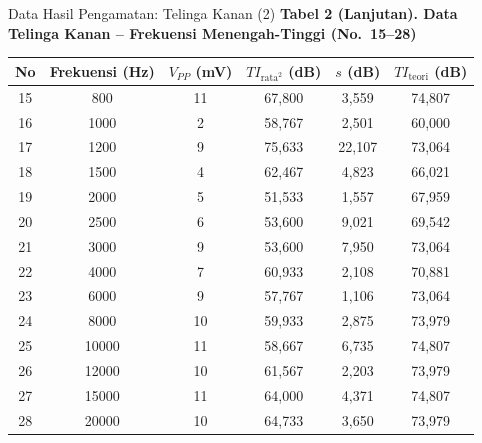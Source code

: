 \documentclass[aspectratio=169, 10pt]{beamer}
\begin{document}
	\begin{frame}{Data Hasil Pengamatan: Telinga Kanan (2)}
		\scriptsize
		\textbf{Tabel 2 (Lanjutan). Data Telinga Kanan -- Frekuensi Menengah-Tinggi (No.\ 15--28)}
		\vspace{0.1cm}
		\begin{tabular}{cccccc}
			\toprule
			No & Frekuensi (Hz) & $V_{PP}$ (mV) & $TI_{\text{rata}^2}$ (dB) & $s$ (dB) & $TI_{\text{teori}}$ (dB) \\
			\midrule
			15 & 800    & 11 & 67{,}800 & 3{,}559  & 74{,}807 \\
			16 & 1000   & 2  & 58{,}767 & 2{,}501  & 60{,}000 \\
			17 & 1200   & 9  & 75{,}633 & 22{,}107 & 73{,}064 \\
			18 & 1500   & 4  & 62{,}467 & 4{,}823  & 66{,}021 \\
			19 & 2000   & 5  & 51{,}533 & 1{,}557  & 67{,}959 \\
			20 & 2500   & 6  & 53{,}600 & 9{,}021  & 69{,}542 \\
			21 & 3000   & 9  & 53{,}600 & 7{,}950  & 73{,}064 \\
			22 & 4000   & 7  & 60{,}933 & 2{,}108  & 70{,}881 \\
			23 & 6000   & 9  & 57{,}767 & 1{,}106  & 73{,}064 \\
			24 & 8000   & 10 & 59{,}933 & 2{,}875  & 73{,}979 \\
			25 & 10000  & 11 & 58{,}667 & 6{,}735  & 74{,}807 \\
			26 & 12000  & 10 & 61{,}567 & 2{,}203  & 73{,}979 \\
			27 & 15000  & 11 & 64{,}000 & 4{,}371  & 74{,}807 \\
			28 & 20000  & 10 & 64{,}733 & 3{,}650  & 73{,}979 \\
			\bottomrule
		\end{tabular}
	\end{frame}
\end{document}
